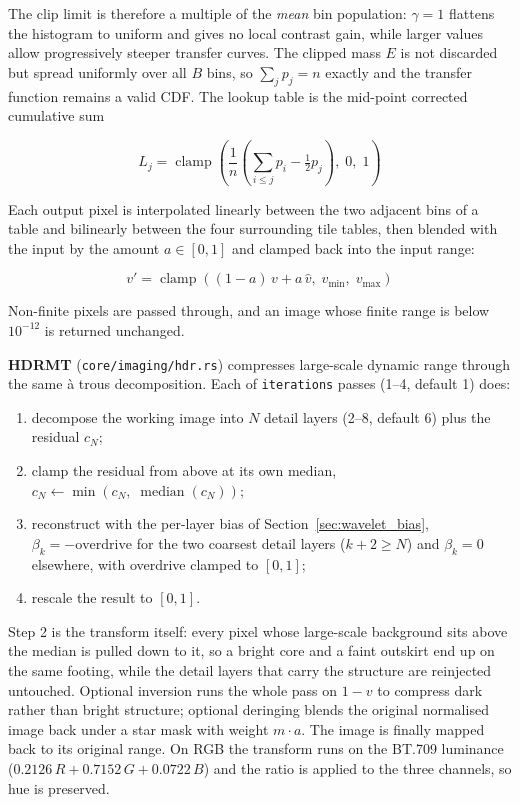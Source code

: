 \documentclass[11pt,a4paper]{article}
\newcommand{\code}[1]{\texttt{\small #1}}
\begin{document}
    The clip limit is therefore a multiple of the \emph{mean} bin population: $\gamma = 1$ flattens the histogram to uniform and gives no local contrast gain, while larger values allow progressively steeper transfer curves. The clipped mass $E$ is not discarded but spread uniformly over all $B$ bins, so $\sum_j p_j = n$ exactly and the transfer function remains a valid CDF. The lookup table is the mid-point corrected cumulative sum

    \begin{equation}
        L_j = \operatorname{clamp}\!\left(\frac{1}{n}\left(\sum_{i \le j} p_i - \tfrac{1}{2} p_j\right),\; 0,\; 1\right)
    \end{equation}

    Each output pixel is interpolated linearly between the two adjacent bins of a table and bilinearly between the four surrounding tile tables, then blended with the input by the amount $a \in [0,1]$ and clamped back into the input range:

    \begin{equation}
        v' = \operatorname{clamp}\!\left((1 - a)\, v + a\, \hat{v},\; v_{\min},\; v_{\max}\right)
    \end{equation}

    Non-finite pixels are passed through, and an image whose finite range is below $10^{-12}$ is returned unchanged.

    \textbf{HDRMT} (\code{core/imaging/hdr.rs}) compresses large-scale dynamic range through the same \`a trous decomposition. Each of \code{iterations} passes (1--4, default 1) does:

    \begin{enumerate}[nosep]
    \item decompose the working image into $N$ detail layers (2--8, default 6) plus the residual $c_N$;
    \item clamp the residual from above at its own median, $c_N \leftarrow \min\!\left(c_N,\; \operatorname{median}(c_N)\right)$;
    \item reconstruct with the per-layer bias of Section~\ref{sec:wavelet_bias}, $\beta_k = -\text{overdrive}$ for the two coarsest detail layers ($k + 2 \ge N$) and $\beta_k = 0$ elsewhere, with overdrive clamped to $[0,1]$;
    \item rescale the result to $[0, 1]$.
    \end{enumerate}

    Step 2 is the transform itself: every pixel whose large-scale background sits above the median is pulled down to it, so a bright core and a faint outskirt end up on the same footing, while the detail layers that carry the structure are reinjected untouched. Optional inversion runs the whole pass on $1 - v$ to compress dark rather than bright structure; optional deringing blends the original normalised image back under a star mask with weight $m \cdot a$. The image is finally mapped back to its original range. On RGB the transform runs on the BT.709 luminance ($0.2126\,R + 0.7152\,G + 0.0722\,B$) and the ratio is applied to the three channels, so hue is preserved.
\end{document}
